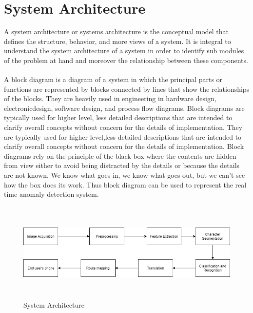 \documentclass[a4paper,12pt]{report}
\begin{document}
\section{System Architecture}
A system architecture or systems architecture is the conceptual model that defines the structure, behavior, and more views of a system. It is integral to understand the system architecture of a system in order to identify sub modules of the problem at hand and moreover the relationship between these components.

\paragraph{}
A block diagram is a diagram of a system in which the principal parts or functions are represented by blocks connected by lines that show the relationships of the blocks. They are heavily used in engineering in hardware design, electronicdesign, software design, and process flow diagrams. Block diagrams are typically used for higher level, less detailed descriptions that are intended to clarify overall concepts without concern for the details of implementation. They are typically used for higher level,less detailed descriptions that are intended to clarify overall concepts without concern for the details of implementation. Block diagrams rely on the principle of the black box where the contents are hidden from view either to avoid being distracted by the details or because the details are not known. We know what goes in, we know what goes out, but we can’t see how the box does its work. Thus block diagram can be used to represent the real time anomaly detection system.

\vspace*{0.1cm}
\begin{figure}[!h]
	\begin{center}
		\includegraphics[width=12cm , height= 5cm]{overall.png}    
		\caption{System Architecture}
		\label{fig1}
	\end{center}
\end{figure}
\vspace*{0.2cm}
\end{document}
